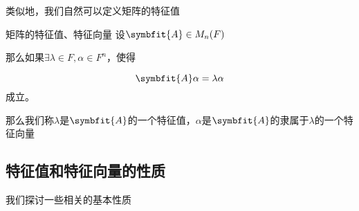 \documentclass[12pt, a4paper, oneside, UTF8]{ctexbook}
\begin{document}
			类似地，我们自然可以定义矩阵的特征值
			\begin{defn}{矩阵的特征值、特征向量}{}
				设$\symbfit{A} \in M_n(F)$

				那么如果$\exists \lambda \in F,\alpha \in F^n$，使得

				\begin{equation}
					\symbfit{A}\alpha =\lambda \alpha 
				\end{equation}
				成立。

				那么我们称$\lambda $是$\symbfit{A}$的一个特征值，$\alpha $是$\symbfit{A}$的隶属于$\lambda $的一个特征向量
			\end{defn}
		\subsection{特征值和特征向量的性质}
			我们探讨一些相关的基本性质
\end{document}
